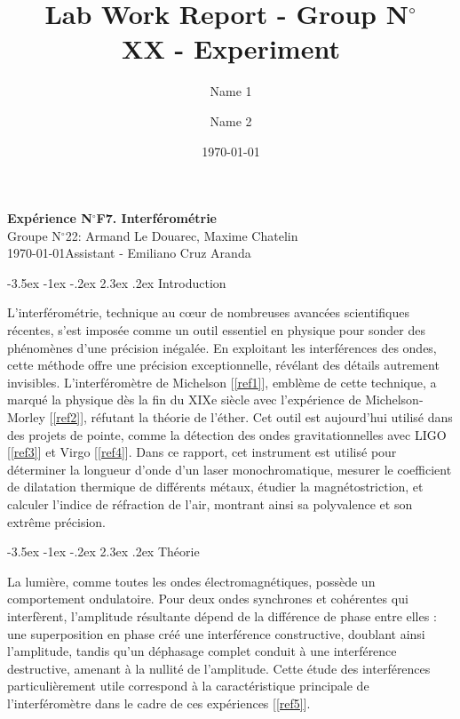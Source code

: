 \documentclass[a4paper, 12pt,oneside]{article}
\makeatletter
\renewcommand{\section}{\@startsection {section}{1}{\z@}%
             {-3.5ex \@plus -1ex \@minus -.2ex}%
             {2.3ex \@plus.2ex}%
             {\normalfont\normalsize\bfseries}}
\makeatother
\begin{document}
\title{\normalsize{Lab Work Report - Group N$^\circ$\\ XX - Experiment}}
\date{\normalsize{\today}}
\author{\normalsize{Name} 1\and \normalsize{Name 2}}

\begin{center}
\large\textbf{\sffamily Expérience N$^\circ$F7. Interférométrie}\\%
\large\sffamily Groupe N$^\circ$22: Armand Le Douarec, Maxime Chatelin\\%
\large\sffamily\today\quad   Assistant -  Emiliano Cruz Aranda \\%
\end{center}

\section{Introduction}

L'interférométrie, technique au cœur de nombreuses avancées scientifiques récentes, s'est imposée comme un outil essentiel en physique pour sonder des phénomènes d'une précision inégalée. En exploitant les interférences des ondes, cette méthode offre une précision exceptionnelle, révélant des détails autrement invisibles. L'interféromètre de Michelson [\ref{ref1}], emblème de cette technique, a marqué la physique dès la fin du XIXe siècle avec l'expérience de Michelson-Morley [\ref{ref2}], réfutant la théorie de l'éther. Cet outil est aujourd'hui utilisé dans des projets de pointe, comme la détection des ondes gravitationnelles avec LIGO [\ref{ref3}] et Virgo [\ref{ref4}]. Dans ce rapport, cet instrument est utilisé pour déterminer la longueur d'onde d'un laser monochromatique, mesurer le coefficient de dilatation thermique de différents métaux, étudier la magnétostriction, et calculer l'indice de réfraction de l'air, montrant ainsi sa polyvalence et son extrême précision.

\section{Théorie}

La lumière, comme toutes les ondes électromagnétiques, possède un comportement ondulatoire. Pour deux ondes synchrones et cohérentes qui interfèrent, l’amplitude résultante dépend de la différence de phase entre elles : une superposition en phase créé une interférence constructive, doublant ainsi l’amplitude, tandis qu’un déphasage complet conduit à une interférence destructive, amenant à la nullité de l'amplitude. Cette étude des interférences particulièrement utile correspond à la caractéristique principale de l'interféromètre dans le cadre de ces expériences [\ref{ref5}].
\end{document}
